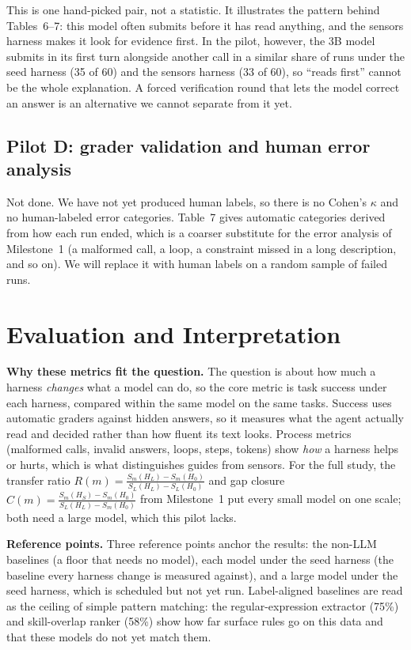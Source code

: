 \documentclass[11pt]{article}
\begin{document}
This is one hand-picked pair, not a statistic. It illustrates the pattern behind Tables~6--7: this model often submits before it has read anything, and the sensors harness makes it look for evidence first. In the pilot, however, the 3B model submits in its first turn alongside another call in a similar share of runs under the seed harness (35 of 60) and the sensors harness (33 of 60), so ``reads first'' cannot be the whole explanation. A forced verification round that lets the model correct an answer is an alternative we cannot separate from it yet.

\subsection{Pilot D: grader validation and human error analysis}
Not done. We have not yet produced human labels, so there is no Cohen's $\kappa$ and no human-labeled error categories. Table~7 gives automatic categories derived from how each run ended, which is a coarser substitute for the error analysis of Milestone~1 (a malformed call, a loop, a constraint missed in a long description, and so on). We will replace it with human labels on a random sample of failed runs.

\section{Evaluation and Interpretation}

\textbf{Why these metrics fit the question.} The question is about how much a harness \textit{changes} what a model can do, so the core metric is task success under each harness, compared within the same model on the same tasks. Success uses automatic graders against hidden answers, so it measures what the agent actually read and decided rather than how fluent its text looks. Process metrics (malformed calls, invalid answers, loops, steps, tokens) show \textit{how} a harness helps or hurts, which is what distinguishes guides from sensors. For the full study, the transfer ratio $R(m)=\frac{S_m(H_L)-S_m(H_0)}{S_L(H_L)-S_L(H_0)}$ and gap closure $C(m)=\frac{S_m(H_S)-S_m(H_0)}{S_L(H_L)-S_m(H_0)}$ from Milestone~1 put every small model on one scale; both need a large model, which this pilot lacks.

\textbf{Reference points.} Three reference points anchor the results: the non-LLM baselines (a floor that needs no model), each model under the seed harness (the baseline every harness change is measured against), and a large model under the seed harness, which is scheduled but not yet run. Label-aligned baselines are read as the ceiling of simple pattern matching: the regular-expression extractor (75\%) and skill-overlap ranker (58\%) show how far surface rules go on this data and that these models do not yet match them.
\end{document}
